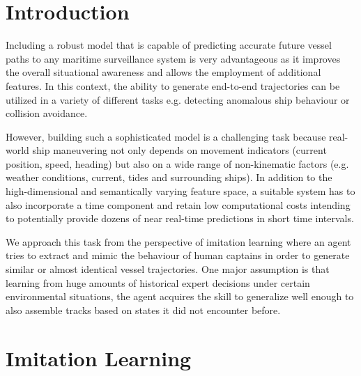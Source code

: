 \documentclass[conference]{IEEEtran}
\begin{document}
\section{Introduction}
Including a robust model that is capable of predicting accurate future vessel paths to any maritime surveillance system is very advantageous as it improves the overall situational awareness and allows the employment of additional features. In this context, the ability to generate end-to-end trajectories can be utilized in a variety of different tasks e.g. detecting anomalous ship behaviour or collision avoidance.
\par
However, building such a sophisticated model is a challenging task because real-world ship maneuvering not only depends on movement indicators (current position, speed, heading) but also on a wide range of non-kinematic factors (e.g. weather conditions, current, tides and surrounding ships). In addition to the high-dimensional and semantically varying feature space, a suitable system has to also incorporate a time component and retain low computational costs intending to potentially provide dozens of near real-time predictions in short time intervals.
\par
We approach this task from the perspective of imitation learning where an agent tries to extract and mimic the behaviour of human captains in order to generate similar or almost identical vessel trajectories. One major assumption is that learning from huge amounts of historical expert decisions under certain environmental situations, the agent acquires the skill to generalize well enough to also assemble tracks based on states it did not encounter before.

\section{Imitation Learning}
\end{document}
